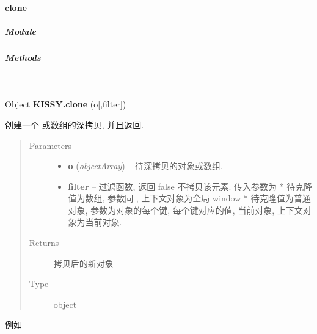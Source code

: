 \documentclass[letterpaper,10pt,english]{sphinxmanual}
\begin{document}
\paragraph{clone}
\label{api/seed/lang/clone:clone}\label{api/seed/lang/clone::doc}

\subparagraph{Module}
\label{api/seed/lang/clone:module}\begin{quote}

{\hyperref[api/seed/lang/index:module-Lang]{}}
\end{quote}


\subparagraph{Methods}
\label{api/seed/lang/clone:methods}

\begin{fulllineitems}
\label{api/seed/lang/clone:Lang.KISSY.clone}~
\begin{DUlineblock}{0em}
\item[] Object \textbf{KISSY.clone} (o{[},filter{]})
\item[] 创建一个 {\hyperref[api/seed/lang/isPlainObject:Lang.KISSY.isPlainObject]{}} 或数组的深拷贝, 并且返回.
\end{DUlineblock}
\begin{quote}\begin{description}
\item[{Parameters}] \leavevmode\begin{itemize}
\item {}
\textbf{o} (\emph{object\textbar{}Array}) -- 待深拷贝的对象或数组.

\item {}
\textbf{filter} -- 过滤函数, 返回 false 不拷贝该元素. 传入参数为
* 待克隆值为数组, 参数同 {\hyperref[api/seed/lang/filter:Lang.KISSY.filter]{}} , 上下文对象为全局 window
* 待克隆值为普通对象, 参数为对象的每个键, 每个键对应的值, 当前对象, 上下文对象为当前对象.

\end{itemize}

\item[{Returns}] \leavevmode
拷贝后的新对象

\item[{Type }] \leavevmode
object

\end{description}\end{quote}

例如


\end{fulllineitems}
\end{document}
